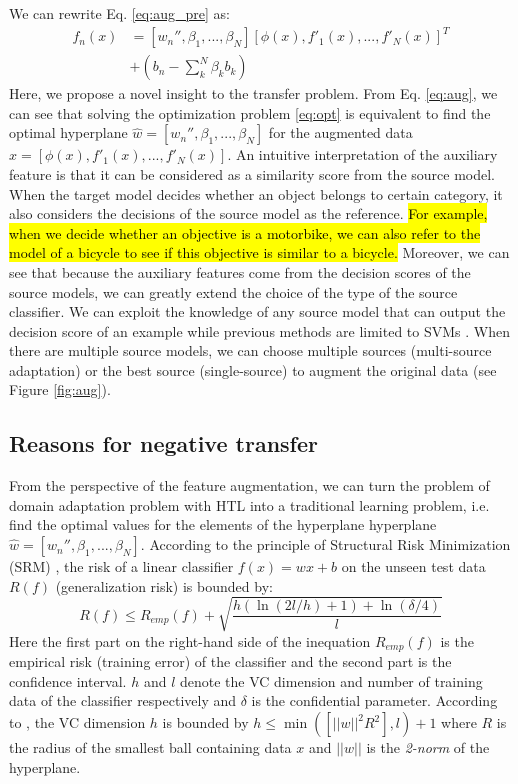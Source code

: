 We can rewrite Eq. \eqref{eq:aug_pre} as:
\begin{equation}\label{eq:aug}
\begin{aligned}
f_n(x)&= [w_{n}'',\beta_1,...,\beta_N][\phi(x),f'_1(x),...,f'_N(x)]^T\\&+(b_n-\sum\limits_k^N{\beta _kb_k})
\end{aligned}
\end{equation}
Here, we propose a novel insight to the transfer problem. From Eq. \eqref{eq:aug}, we can see that solving the optimization problem \eqref{eq:opt} is equivalent to find the optimal hyperplane $\hat{w}=[w_{n}'',\beta_1,...,\beta_N]$ for the augmented data $\hat{x}=[\phi(x),f'_1(x),...,f'_N(x)]$. An intuitive interpretation of the auxiliary feature is that it can be considered as a similarity score from the source model. When the target model decides whether an object belongs to certain category, it also considers the decisions of the source model as the reference. \hl{For example, when we decide whether an objective is a motorbike, we can also refer to the model of a bicycle to see if this objective is similar to a bicycle.}
Moreover, we can see that because the auxiliary features come from the decision scores of the source models, we can greatly extend the choice of the type of the source classifier. We can exploit the knowledge of any source model that can output the decision score of an example while previous methods are limited to SVMs \cite{tommasi2014learning} \cite{kuzborskij2013n}. When there are multiple source models, we can choose multiple sources (multi-source adaptation) or the best source (single-source) to augment the original data (see Figure \ref{fig:aug}).



\subsection{Reasons for negative transfer}
From the perspective of the feature augmentation, we can turn the problem of domain adaptation problem with HTL into a traditional learning problem, i.e. find the optimal values for the elements of the hyperplane hyperplane $\hat{w}=[w_{n}'',\beta_1,...,\beta_N]$. According to the principle of Structural Risk Minimization (SRM) \cite{vapnik1999overview}, the risk of a linear classifier $f(x)=wx+b$ on the unseen test data $R(f)$ (generalization risk) is bounded by:
\begin{equation}\label{eq:srm}
R(f) \le {R_{emp}}(f) + \sqrt {\frac{{h(\ln (2l/h) + 1) + \ln (\delta /4)}}{l}} 
\end{equation}
Here the first part on the right-hand side of the inequation ${R_{emp}}(f)$ is the empirical risk (training error) of the classifier and the second part is the confidence interval. $h$ and $l$ denote the VC dimension and number of training data of the classifier respectively and $\delta$ is the confidential parameter. According to \cite{suykens1999least}, the VC dimension $h$ is bounded by $h \le \min([||w||^2R^2],l)+1$ where $R$ is the radius of the smallest ball containing data $x$ and $||w||$ is the \textit{2-norm} of the hyperplane.

